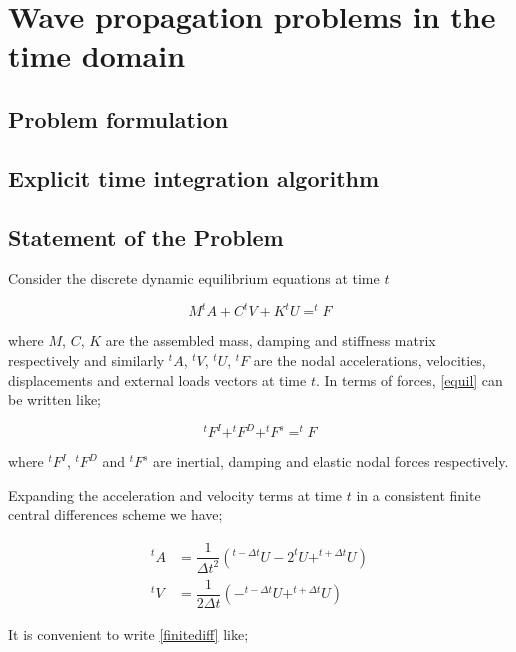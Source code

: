 %
\cleardoublepage {}
\chapter{Wave propagation problems in the time domain}
\section{Problem formulation}
\section{Explicit time integration algorithm}
\section{Statement of the Problem}
Consider the discrete dynamic equilibrium equations at time $t$

\begin{equation}
M^{t}A+C^{t}V+K^{t}U=^{t}F
\label{equil}
\end{equation}

where $M$, $C$, $K$ are the assembled mass, damping and stiffness matrix respectively and similarly $^{t}A$, $^{t}V$, $^{t}U$, $^{t}F$ are the nodal accelerations, velocities, displacements and external loads vectors at time $t$. In terms of forces, \cref{equil} can be written like;

\begin{equation}
^{t}F^I+^{t}F^D+^{t}F^s=^{t}F
\label{force equil}
\end{equation}

where $^{t}F^I$, $^{t}F^D$ and $^{t}F^s$ are inertial, damping and elastic nodal forces respectively.

Expanding the acceleration and velocity terms at time $t$ in a consistent finite central differences scheme we have;

\begin{equation}
\begin{aligned}
^{t}A&=\dfrac{1}{\Delta t^2}\left(^{t-\Delta t}U-2^{t}U+^{t+\Delta t}U\right)\\
^{t}V&=\dfrac{1}{2\Delta t}\left(-^{t-\Delta t}U+^{t+\Delta t}U\right)
\end{aligned}
\label{finitediff}
\end{equation}

It is convenient to write \cref{finitediff} like;

